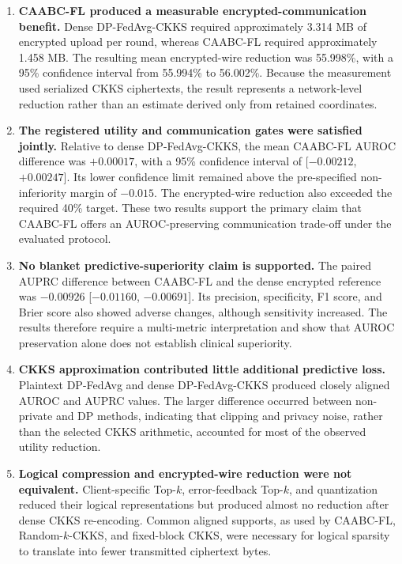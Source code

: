 \begin{enumerate}
    \item \textbf{CAABC-FL produced a measurable encrypted-communication benefit.} Dense DP-FedAvg-CKKS required approximately 3.314 MB of encrypted upload per round, whereas CAABC-FL required approximately 1.458 MB. The resulting mean encrypted-wire reduction was 55.998\%, with a 95\% confidence interval from 55.994\% to 56.002\%. Because the measurement used serialized CKKS ciphertexts, the result represents a network-level reduction rather than an estimate derived only from retained coordinates.

    \item \textbf{The registered utility and communication gates were satisfied jointly.} Relative to dense DP-FedAvg-CKKS, the mean CAABC-FL AUROC difference was $+0.00017$, with a 95\% confidence interval of [$-0.00212$, $+0.00247$]. Its lower confidence limit remained above the pre-specified non-inferiority margin of $-0.015$. The encrypted-wire reduction also exceeded the required 40\% target. These two results support the primary claim that CAABC-FL offers an AUROC-preserving communication trade-off under the evaluated protocol.

    \item \textbf{No blanket predictive-superiority claim is supported.} The paired AUPRC difference between CAABC-FL and the dense encrypted reference was $-0.00926$ [$-0.01160$, $-0.00691$]. Its precision, specificity, F1 score, and Brier score also showed adverse changes, although sensitivity increased. The results therefore require a multi-metric interpretation and show that AUROC preservation alone does not establish clinical superiority.

    \item \textbf{CKKS approximation contributed little additional predictive loss.} Plaintext DP-FedAvg and dense DP-FedAvg-CKKS produced closely aligned AUROC and AUPRC values. The larger difference occurred between non-private and DP methods, indicating that clipping and privacy noise, rather than the selected CKKS arithmetic, accounted for most of the observed utility reduction.

    \item \textbf{Logical compression and encrypted-wire reduction were not equivalent.} Client-specific Top-$k$, error-feedback Top-$k$, and quantization reduced their logical representations but produced almost no reduction after dense CKKS re-encoding. Common aligned supports, as used by CAABC-FL, Random-$k$-CKKS, and fixed-block CKKS, were necessary for logical sparsity to translate into fewer transmitted ciphertext bytes.


\end{enumerate}
